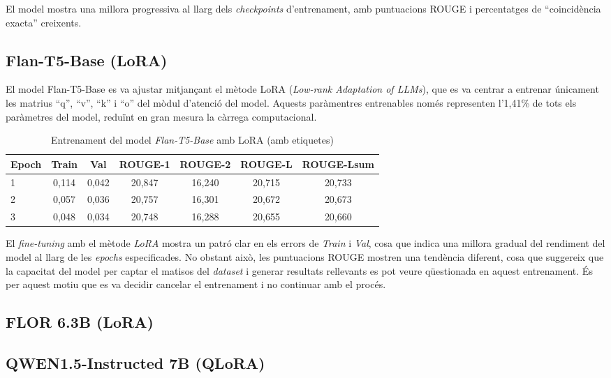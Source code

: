 El model mostra una millora progressiva al llarg dels \textit{checkpoints} d'entrenament, amb puntuacions ROUGE i percentatges de ``coincidència exacta'' creixents.

\subsection{Flan-T5-Base (LoRA)}
El model Flan-T5-Base es va ajustar mitjançant el mètode LoRA (\textit{Low-rank Adaptation of LLMs}), que es va centrar a entrenar únicament les matrius ``q'', ``v'', ``k'' i ``o'' del mòdul d'atenció del model. Aquests paràmentres entrenables només representen l'1,41\% de tots els paràmetres del model, reduïnt en gran mesura la càrrega computacional.
\begin{table}[H]
    \centering
    \label{tab:additional-training}
    \begin{tabular}{lcccccc}
    \toprule
    Epoch & Train & Val & ROUGE-1 & ROUGE-2 & ROUGE-L & ROUGE-Lsum \\
    \midrule
    1 & 0,114 & 0,042 & 20,847 & 16,240 & 20,715 & 20,733 \\
    2 & 0,057 & 0,036 & 20,757 & 16,301 & 20,672 & 20,673 \\
    3 & 0,048 & 0,034 & 20,748 & 16,288 & 20,655 & 20,660 \\
    \bottomrule
    \end{tabular}
    \caption[Entrenament del model \textit{Flan-T5-Base} amb LoRA]{Entrenament del model \textit{Flan-T5-Base} amb LoRA (amb etiquetes)}
\end{table}
El \textit{fine-tuning} amb el mètode \textit{LoRA} mostra un patró clar en els errors de \textit{Train} i \textit{Val}, cosa que indica una millora gradual del rendiment del model al llarg de les \textit{epochs} especificades. No obstant això, les puntuacions ROUGE mostren una tendència diferent, cosa que suggereix que la capacitat del model per captar el matisos del \textit{dataset} i generar resultats rellevants es pot veure qüestionada en aquest entrenament. És per aquest motiu que es va decidir cancelar el entrenament i no continuar amb el procés.

\subsection{FLOR 6.3B (LoRA)}

\subsection{QWEN1.5-Instructed 7B (QLoRA)}

